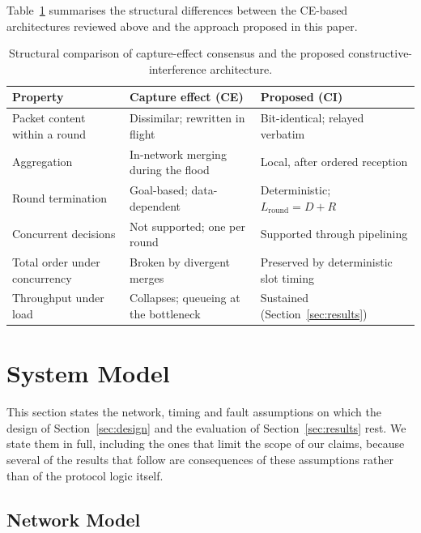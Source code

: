 \documentclass[journal]{IEEEtran}
\newcommand{\CI}{CI}                      %
\newcommand{\CE}{CE}                      %
\newcommand{\Diam}{D}                     %
\newcommand{\Nretx}{R}                    %
\newcommand{\Lround}{L_{\mathrm{round}}}  %
\begin{document}
Table~\ref{tab:ce-vs-ci} summarises the structural differences between the
\CE-based architectures reviewed above and the approach proposed in this
paper.

\begin{table}[!t]
\renewcommand{\arraystretch}{1.25}
\caption{Structural comparison of capture-effect consensus and the
proposed constructive-interference architecture.}
\label{tab:ce-vs-ci}
\centering
\begin{tabular}{@{}p{}p{}p{}@{}}
\toprule
\textbf{Property} & \textbf{Capture effect (\CE)} & \textbf{Proposed (\CI)} \\
\midrule
Packet content within a round &
Dissimilar; rewritten in flight &
Bit-identical; relayed verbatim \\

Aggregation &
In-network merging during the flood &
Local, after ordered reception \\

Round termination &
Goal-based; data-dependent &
Deterministic; $\Lround = \Diam + \Nretx$ \\

Concurrent decisions &
Not supported; one per round &
Supported through pipelining \\

Total order under concurrency &
Broken by divergent merges &
Preserved by deterministic slot timing \\

Throughput under load &
Collapses; queueing at the bottleneck &
Sustained\,(Section~\ref{sec:results}) \\
\bottomrule
\end{tabular}
\end{table}

\section{System Model}
\label{sec:model}
This section states the network, timing and fault assumptions on which the
design of Section~\ref{sec:design} and the evaluation of
Section~\ref{sec:results} rest. We state them in full, including the ones
that limit the scope of our claims, because several of the results that
follow are consequences of these assumptions rather than of the protocol
logic itself.

\subsection{Network Model}
\label{sec:model-network}
\end{document}
